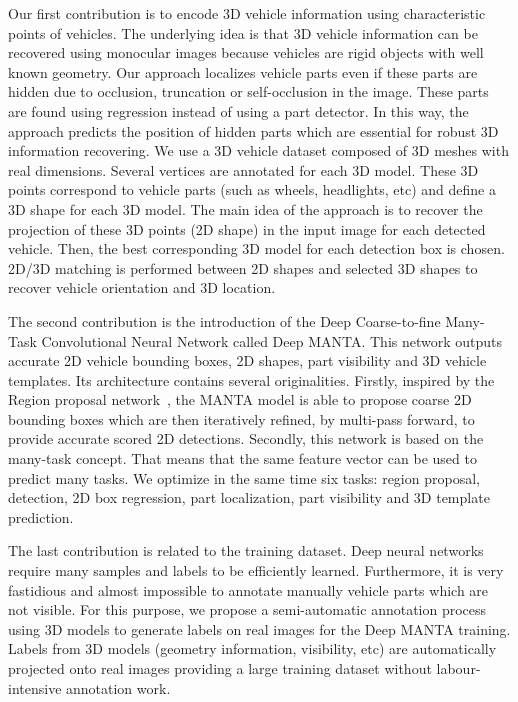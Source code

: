 \documentclass[10pt,twocolumn,letterpaper]{article}
\begin{document}
Our first contribution is to encode 3D vehicle information using characteristic points of vehicles. The underlying idea is that 3D vehicle information can be recovered using monocular images because vehicles are rigid objects with well known geometry. Our approach localizes vehicle parts even if these parts are hidden due to occlusion, truncation or self-occlusion in the image. These parts are found using regression instead of using a part detector. In this way, the approach predicts the position of hidden parts which are essential for robust 3D information recovering. We use a 3D vehicle dataset composed of 3D meshes with real dimensions. Several vertices are annotated for each 3D model. These 3D points correspond to vehicle parts (such as wheels, headlights, etc) and define a 3D shape for each 3D model. The main idea of the approach is to recover the projection of these 3D points (2D shape) in the input image for each detected vehicle. Then, the best corresponding 3D model for each detection box is chosen. 2D/3D matching is performed between 2D shapes and selected 3D shapes to recover vehicle orientation and 3D location.

The second contribution is the introduction of the Deep Coarse-to-fine Many-Task Convolutional Neural Network called Deep MANTA. This network outputs accurate 2D vehicle bounding boxes, 2D shapes, part visibility and 3D vehicle templates. Its architecture contains several originalities. Firstly, inspired by the Region proposal network~\cite{faster}, the MANTA model is able to propose coarse 2D bounding boxes which are then iteratively refined, by multi-pass forward, to provide accurate scored 2D detections. Secondly, this network is based on the many-task concept. That means that the same feature vector can be used to predict many tasks. We optimize in the same time six tasks: region proposal, detection, 2D box regression, part localization, part visibility and 3D template prediction.

The last contribution is related to the training dataset. Deep neural networks require many samples and labels to be efficiently learned. Furthermore, it is very fastidious and almost impossible to annotate manually vehicle parts which are not visible. For this purpose, we propose a semi-automatic annotation process using 3D models to generate labels on real images for the Deep MANTA training. Labels from 3D models (geometry information, visibility, etc) are automatically projected onto real images providing a large training dataset without labour-intensive annotation work. 
\end{document}
